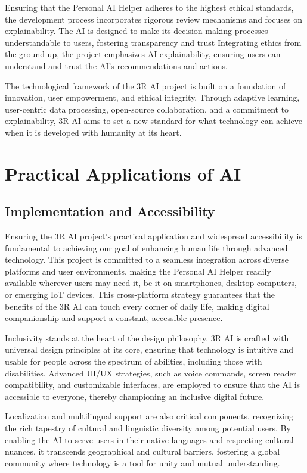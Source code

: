 \documentclass[12pt]{article}
\begin{document}
Ensuring that the Personal AI Helper adheres to the highest ethical standards, the development process incorporates rigorous review mechanisms and focuses on explainability. The AI is designed to make its decision-making processes understandable to users, fostering transparency and trust Integrating ethics from the ground up, the project emphasizes AI explainability, ensuring users can understand and trust the AI's recommendations and actions.

The technological framework of the 3R AI project is built on a foundation of innovation, user empowerment, and ethical integrity. Through adaptive learning, user-centric data processing, open-source collaboration, and a commitment to explainability, 3R AI aims to set a new standard for what technology can achieve when it is developed with humanity at its heart.



\section{Practical Applications of AI}

\subsection{Implementation and Accessibility}

Ensuring the 3R AI project's practical application and widespread accessibility is fundamental to achieving our goal of enhancing human life through advanced technology. This project is committed to a seamless integration across diverse platforms and user environments, making the Personal AI Helper readily available wherever users may need it, be it on smartphones, desktop computers, or emerging IoT devices. This cross-platform strategy guarantees that the benefits of the 3R AI can touch every corner of daily life, making digital companionship and support a constant, accessible presence.

Inclusivity stands at the heart of the design philosophy. 3R AI is crafted with universal design principles at its core, ensuring that technology is intuitive and usable for people across the spectrum of abilities, including those with disabilities. Advanced UI/UX strategies, such as voice commands, screen reader compatibility, and customizable interfaces, are employed to ensure that the AI is accessible to everyone, thereby championing an inclusive digital future.

Localization and multilingual support are also critical components, recognizing the rich tapestry of cultural and linguistic diversity among potential users. By enabling the AI to serve users in their native languages and respecting cultural nuances, it transcends geographical and cultural barriers, fostering a global community where technology is a tool for unity and mutual understanding.
\end{document}
